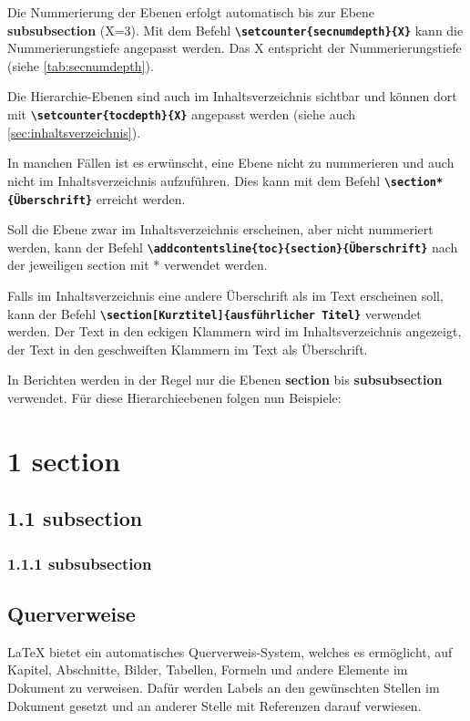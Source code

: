 
Die Nummerierung der Ebenen erfolgt automatisch bis zur Ebene \textbf{subsubsection} (X=3).
Mit dem Befehl \textbf{\texttt{\textbackslash setcounter\{secnumdepth\}\{X\}}} kann die Nummerierungstiefe angepasst werden. Das X entspricht der Nummerierungstiefe (siehe \autoref{tab:secnumdepth}).


Die Hierarchie-Ebenen sind auch im Inhaltsverzeichnis sichtbar und können dort mit \textbf{\texttt{\textbackslash setcounter\{tocdepth\}\{X\}}} angepasst werden (siehe auch \ref{sec:inhaltsverzeichnis}).

In manchen Fällen ist es erwünscht, eine Ebene nicht zu nummerieren und auch nicht im Inhaltsverzeichnis aufzuführen. Dies kann mit dem Befehl \textbf{\texttt{\textbackslash section*\{Überschrift\}}} erreicht werden.

Soll die Ebene zwar im Inhaltsverzeichnis erscheinen, aber nicht nummeriert werden, kann der Befehl \textbf{\texttt{\textbackslash addcontentsline\{toc\}\{section\}\{Überschrift\}}} nach der jeweiligen section mit * verwendet werden.

Falls im Inhaltsverzeichnis eine andere Überschrift als im Text erscheinen soll, kann der Befehl \textbf{\texttt{\textbackslash section[Kurztitel]\{ausführlicher Titel\}}} verwendet werden. Der Text in den eckigen Klammern wird im Inhaltsverzeichnis angezeigt, der Text in den geschweiften Klammern im Text als Überschrift.

In Berichten werden in der Regel nur die Ebenen \textbf{section} bis \textbf{subsubsection} verwendet. Für diese Hierarchieebenen folgen nun Beispiele:
\section*{1 \hspace{0.15cm} section}

\subsection*{1.1 \hspace{0.15cm} subsection}

\subsubsection*{1.1.1 \hspace{0.15cm} subsubsection}


\subsection{Querverweise}
\label{sec:querverweise}
\LaTeX{} bietet ein automatisches Querverweis-System, welches es ermöglicht, auf Kapitel, Abschnitte, Bilder, Tabellen, Formeln und andere Elemente im Dokument zu verweisen.
Dafür werden Labels an den gewünschten Stellen im Dokument gesetzt und an anderer Stelle mit Referenzen darauf verwiesen.

